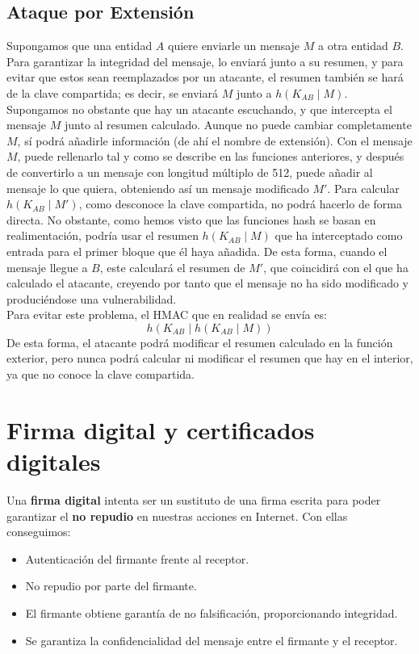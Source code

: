 \subsection{Ataque por Extensión}

Supongamos que una entidad $A$ quiere enviarle un mensaje $M$ a otra entidad $B$. Para garantizar la integridad del mensaje, lo enviará junto a su resumen, y para evitar que estos sean reemplazados por un atacante, el resumen también se hará de la clave compartida; es decir, se enviará $M$ junto a $h(K_{AB}\mid M)$.\\

Supongamos no obstante que hay un atacante escuchando, y que intercepta el mensaje $M$ junto al resumen calculado. Aunque no puede cambiar completamente $M$, sí podrá añadirle información (de ahí el nombre de extensión). Con el mensaje $M$, puede rellenarlo tal y como se describe en las funciones anteriores, y después de convertirlo a un mensaje con longitud múltiplo de 512, puede añadir al mensaje lo que quiera, obteniendo así un mensaje modificado $M'$. Para calcular $h(K_{AB}\mid M')$, como desconoce la clave compartida, no podrá hacerlo de forma directa. No obstante, como hemos visto que las funciones hash se basan en realimentación, podría usar el resumen $h(K_{AB}\mid M)$ que ha interceptado como entrada para el primer bloque que él haya añadida. De esta forma, cuando el mensaje llegue a $B$, este calculará el resumen de $M'$, que coincidirá con el que ha calculado el atacante, creyendo por tanto que el mensaje no ha sido modificado y produciéndose una vulnerabilidad.\\

Para evitar este problema, el \acrshort{HMAC} que en realidad se envía es:
\begin{equation*}
    h\left(K_{AB}\mid h(K_{AB}\mid M)\right)
\end{equation*}
De esta forma, el atacante podrá modificar el resumen calculado en la función exterior, pero nunca podrá calcular ni modificar el resumen que hay en el interior, ya que no conoce la clave compartida.

\section{Firma digital y certificados digitales}

Una \textbf{firma digital} intenta ser un sustituto de una firma escrita para poder garantizar el \textbf{no repudio} en nuestras acciones en Internet. Con ellas conseguimos:
\begin{itemize}
    \item Autenticación del firmante frente al receptor.
    \item No repudio por parte del firmante.
    \item El firmante obtiene garantía de no falsificación, proporcionando integridad.
    \item Se garantiza la confidencialidad del mensaje entre el firmante y el receptor.
\end{itemize}

